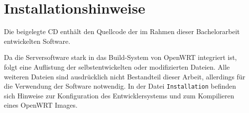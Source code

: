 \chapter{Installationshinweise}
Die beigelegte CD enthält den Quellcode der im Rahmen dieser Bachelorarbeit
entwickelten Software.

Da die Serversoftware stark in das Build-System von OpenWRT integriert
ist, folgt eine Auflistung der selbstentwickelten oder modifizierten Dateien.
\vspace{1pt}
\vspace{1pt}
Alle weiteren Dateien sind ausdrücklich nicht Bestandteil dieser Arbeit,
allerdings für die Verwendung der Software notwendig.
In der Datei \texttt{Installation} befinden sich Hinweise zur Konfiguration des
Entwicklersystems und zum Kompilieren eines OpenWRT Images.